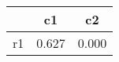 \begin{table}[htbp]
\begin{tabular}{lcc} \hline \hline
 & c1  & c2  \\  \hline 
r1 &     0.627 &     0.000 \\  
\hline \hline \end{tabular}
\end{table}
